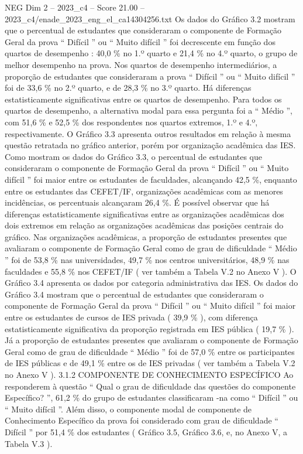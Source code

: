 \begin{textsample}{NEG Dim 2 – 2023\_c4 – Score 21.00 – 2023\_c4/enade\_2023\_eng\_el\_ca14304256.txt}
Os dados do Gráfico 3.2 mostram que o percentual de estudantes que consideraram o componente de Formação Geral da prova “ Difícil ” ou “ Muito difícil ” foi decrescente em função dos quartos de desempenho : 40,0 \% no 1.º quarto e 21,4 \% no 4.º quarto, o grupo de melhor desempenho na prova.
Nos quartos de desempenho intermediários, a proporção de estudantes que consideraram a prova “ Difícil ” ou “ Muito difícil ” foi de 33,6 \% no 2.º quarto, e de 28,3 \% no 3.º quarto.
Há diferenças estatisticamente significativas entre os quartos de desempenho.
Para todos os quartos de desempenho, a alternativa modal para essa pergunta foi a “ Médio ”, com 51,6 \% e 52,5 \% dos respondentes nos quartos extremos, 1.º e 4.º, respectivamente.
O Gráfico 3.3 apresenta outros resultados em relação à mesma questão retratada no gráfico anterior, porém por organização acadêmica das IES.
Como mostram os dados do Gráfico 3.3, o percentual de estudantes que consideraram o componente de Formação Geral da prova “ Difícil ” ou “ Muito difícil ” foi maior entre os estudantes de faculdades, alcançando 42,5 \%, enquanto entre os estudantes das CEFET/IF, organizações acadêmicas com as menores incidências, os percentuais alcançaram 26,4 \%.
É possível observar que há diferenças estatisticamente significativas entre as organizações acadêmicas dos dois extremos em relação as organizações acadêmicas das posições centrais do gráfico.
Nas organizações acadêmicas, a proporção de estudantes presentes que avaliaram o componente de Formação Geral como de grau de dificuldade “ Médio ” foi de 53,8 \% nas universidades, 49,7 \% nos centros universitários, 48,9 \% nas faculdades e 55,8 \% nos CEFET/IF ( ver também a Tabela V.2 no Anexo V ).
O Gráfico 3.4 apresenta os dados por categoria administrativa das IES.
Os dados do Gráfico 3.4 mostram que o percentual de estudantes que consideraram o componente de Formação Geral da prova “ Difícil ” ou “ Muito difícil ” foi maior entre os estudantes de cursos de IES privada ( 39,9 \% ), com diferença estatisticamente significativa da proporção registrada em IES pública ( 19,7 \% ).
Já a proporção de estudantes presentes que avaliaram o componente de Formação Geral como de grau de dificuldade “ Médio ” foi de 57,0 \% entre os participantes de IES públicas e de 49,1 \% entre os de IES privadas ( ver também a Tabela V.2 no Anexo V ). 3.1.2 COMPONENTE DE CONHECIMENTO ESPECÍFICO Ao responderem à questão “ Qual o grau de dificuldade das questões do componente Específico? ”, 61,2 \% do grupo de estudantes classificaram -na como “ Difícil ” ou “ Muito difícil ”.
Além disso, o componente modal de componente de Conhecimento Específico da prova foi considerado com grau de dificuldade “ Difícil ” por 51,4 \% dos estudantes ( Gráfico 3.5, Gráfico 3.6, e, no Anexo V, a Tabela V.3 ).

\end{textsample}
